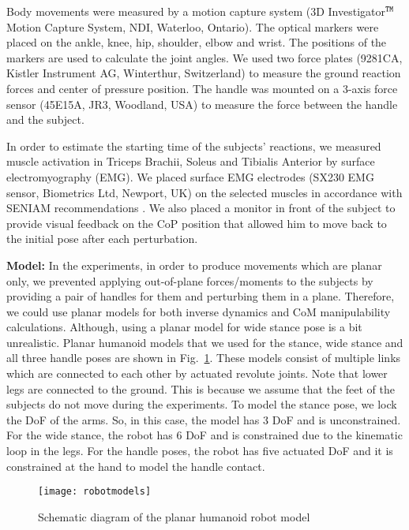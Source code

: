 Body movements were measured by a motion capture system (3D
Investigator$^{\tt\small TM}$ Motion Capture System, NDI, Waterloo, Ontario).
The optical markers were placed on the ankle, knee, hip, shoulder, elbow and
wrist.  The positions of the markers are used to calculate the joint angles.
We used two force plates (9281CA, Kistler Instrument AG, Winterthur,
Switzerland) to measure the ground reaction forces and center of pressure
position.  The handle was mounted on a 3-axis force sensor (45E15A, JR3,
Woodland, USA) to measure the force between the handle and the subject.

In order to estimate the starting time of the subjects' reactions, we measured
muscle activation in Triceps Brachii, Soleus and Tibialis Anterior by surface
electromyography (EMG).  We placed surface EMG electrodes (SX230 EMG sensor,
Biometrics Ltd, Newport, UK) on the selected muscles in accordance with SENIAM
recommendations \cite{Hermensetal99}.  We also placed a monitor in front of
the subject to provide visual feedback on the CoP position that allowed him to
move back to the initial pose after each perturbation.


\textbf{Model:} In the experiments, in order to produce movements which are planar only, we
prevented applying out-of-plane forces/moments to the subjects by providing a
pair of handles for them and perturbing them in a plane.  Therefore, we could
use planar models for both inverse dynamics and CoM manipulability
calculations.  Although, using a planar model for wide stance pose is a bit
unrealistic.  Planar humanoid models that we used for the stance, wide stance
and all three handle poses are shown in Fig.~\ref{planarhumanoids}.  These
models consist of multiple links which are connected to each other by actuated
revolute joints.  Note that lower legs are connected to the ground.  This is
because we assume that the feet of the subjects do not move during the
experiments.  To model the stance pose, we lock the DoF of the arms.  So, in
this case, the model has 3 DoF and is unconstrained.  For the wide stance, the
robot has 6 DoF and is constrained due to the kinematic loop in the legs.  For
the handle poses, the robot has five actuated DoF and it is constrained at the
hand to model the handle contact.
\begin{figure}
	\centering \texttt{[image: robotmodels]}
	\caption{Schematic diagram of the planar humanoid robot model}
	\label{planarhumanoids}
\end{figure}

